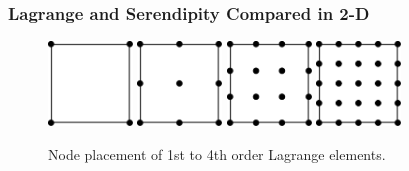 \documentclass[serif,12pt]{beamer}
\begin{document}
\begin{frame}
\frametitle{Lagrange and Serendipity Compared in 2-D}
	\begin{figure}
	    \includegraphics[width=0.20\textwidth]{figures/r1d2.pdf}
	    \hfill
	    \includegraphics[width=0.20\textwidth]{figures/r2d2_lagrange.pdf}
	    \hfill
	    \includegraphics[width=0.20\textwidth]{figures/r3d2_lagrange.pdf}
	    \hfill
	    \includegraphics[width=0.20\textwidth]{figures/r4d2_lagrange.pdf}
	    \caption{Node placement of 1st to 4th order Lagrange elements.}
	\end{figure}


\end{frame}
\end{document}
